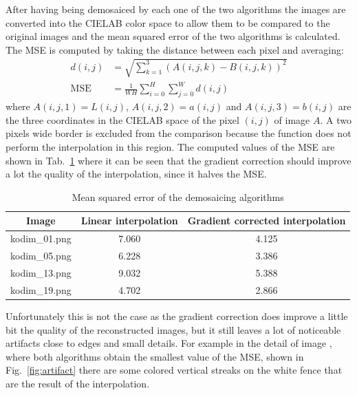 \documentclass[a4paper,oneside]{article}
\begin{document}
After having being demosaiced by each one of the two algorithms the
images are converted into the CIELAB color space to allow them to be
compared to the original images and the mean squared error of the two
algorithms is calculated. The MSE is computed by taking the distance
between each pixel and averaging:
\begin{align*}
  d(i,j) &= \sqrt{\sum_{k=1}^3 \left(A(i,j,k) - B(i,j,k)\right)^2 } \\
  \text{MSE} &= \frac{1}{WH}\sum_{i=0}^H\sum_{j=0}^Wd(i,j)
\end{align*}
where $A(i,j,1) = L(i,j)$, $A(i,j,2) = a(i,j)$ and $A(i,j,3) = b(i,j)$
are the three coordinates in the CIELAB space of the pixel $(i,j)$ of
image $A$. A two pixels wide border is excluded from the comparison
because the function  does not perform the
interpolation in this region.  The computed values of the MSE are
shown in Tab.~\ref{tab:mse} where it can be seen that the gradient
correction should improve a lot the quality of the interpolation,
since it halves the MSE.
\begin{table}[h]
  \centering
  \begin{tabular}{ccc}
    Image & Linear interpolation & Gradient corrected interpolation \\
    \hline
    kodim\_01.png & 7.060 & 4.125 \\
    kodim\_05.png & 6.228 & 3.386 \\
    kodim\_13.png & 9.032 & 5.388 \\
    kodim\_19.png & 4.702 & 2.866
  \end{tabular}
  \caption{Mean squared error of the demosaicing algorithms}
  \label{tab:mse}
\end{table}
Unfortunately this is not the case as the gradient correction does
improve a little bit the quality of the reconstructed images, but it
still leaves a lot of noticeable artifacts close to edges and small
details. For example in the detail of image ,
where both algorithms obtain the smallest value of the MSE, shown in
Fig.~\ref{fig:artifact} there are some colored vertical streaks on the
white fence that are the result of the interpolation.
\end{document}
